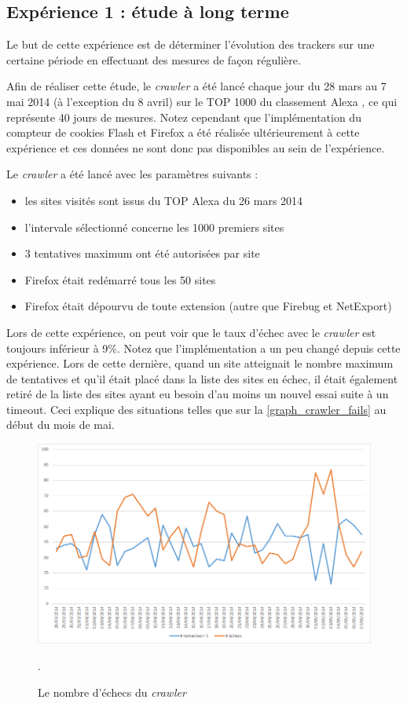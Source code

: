 \subsection{Expérience 1 : étude à long terme}
Le but de cette expérience est de déterminer l'évolution des trackers sur une certaine période en effectuant des mesures de façon régulière.

Afin de réaliser cette étude, le \textit{crawler} a été lancé chaque jour du 28 mars au 7 mai 2014 (à l'exception du 8 avril) sur le TOP 1000 du classement Alexa \cite{AlexaTop}, ce qui représente 40 jours de mesures. Notez cependant que l'implémentation du compteur de cookies Flash et Firefox a été réalisée ultérieurement à cette expérience et ces données ne sont donc pas disponibles au sein de l'expérience.

Le \textit{crawler} a été lancé avec les paramètres suivants :
\begin{itemize}
	\item les sites visités sont issus du TOP Alexa du 26 mars 2014
	\item l'intervale sélectionné concerne les 1000 premiers sites
	\item 3 tentatives maximum ont été autorisées par site
	\item Firefox était redémarré tous les 50 sites
	\item Firefox était dépourvu de toute extension (autre que Firebug et NetExport)
	\newline
\end{itemize}

Lors de cette expérience, on peut voir que le taux d'échec avec le \textit{crawler} est toujours inférieur à 9\%.
Notez que l'implémentation a un peu changé depuis cette expérience. Lors de cette dernière, quand un site atteignait le nombre maximum de tentatives et qu'il était placé dans la liste des sites en échec, il était également retiré de la liste des sites ayant eu besoin d'au moins un nouvel essai suite à un timeout.
Ceci explique des situations telles que sur la \autoref{graph_crawler_fails} au début du mois de mai.

\begin{figure}[h]
	\centering
	\includegraphics[scale=.7]{graphiques/graph_crawler_fails.png}
	\caption{\label{graph_crawler_fails}Le nombre d'échecs du \textit{crawler}}.
\end{figure}

